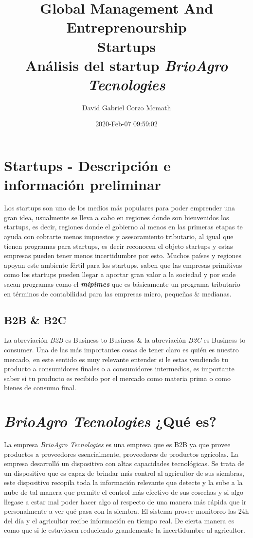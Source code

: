 \documentclass{article}
\title{\Huge Global Management And Entreprenourship \\ Startups \\ Análisis del startup \emph{BrioAgro Tecnologies}}
\author{David Gabriel Corzo Mcmath}
\date{2020-Feb-07 09:59:02}
\begin{document}
\maketitle

\section{Startups - Descripción e información preliminar}
Los startups son uno de los medios más populares para poder emprender una gran idea, usualmente se lleva a cabo en regiones donde son bienvenidos los startups, es decir, regiones donde el gobierno al menos en las primeras etapas te ayuda con cobrarte menos impuestos y asesoramiento tributario, al igual que tienen programas para startups, es decir reconocen el objeto startups y estas empresas pueden tener menos incertidumbre por esto. Muchos países y regiones apoyan este ambiente fértil para los startups, saben que las empresas primitivas como los startups pueden llegar a aportar gran valor a la sociedad y por ende sacan programas como el \emph{\textbf{mipimes}} que es básicamente un programa tributario en términos de contabilidad para las empresas micro, pequeñas \& medianas.

\subsection{B2B \& B2C}
La abreviación \emph{B2B} es Business to Business \& la abreviación \emph{B2C} es Business to consumer. Una de las más importantes cosas de tener claro es quién es nuestro mercado, en este sentido es muy relevante entender si le estas vendiendo tu producto a consumidores finales o a consumidores intermedios, es importante saber si tu producto es recibido por el mercado como materia prima o como bienes de consumo final.


\section{\emph{BrioAgro Tecnologies} ¿Qué es?}
La empresa \emph{BrioAgro Tecnologies} es una empresa que es B2B ya que provee productos a proveedores esencialmente, proveedores de productos agrícolas. La empresa desarrolló un dispositivo con altas capacidades tecnológicas. Se trata de un dispositivo que es capaz de brindar más control al agricultor de sus siembras, este dispositivo recopila toda la información relevante que detecte y la sube a la nube de tal manera que permite el control más efectivo de sus cosechas y si algo llegase a estar mal poder hacer algo al respecto de una manera más rápida que ir personalmente a ver qué pasa con la siembra.
\newline 
El sistema provee monitoreo las 24h del día y el agricultor recibe información en tiempo real. De cierta manera es como que si le estuviesen reduciendo grandemente la incertidumbre al agricultor.
\end{document}
